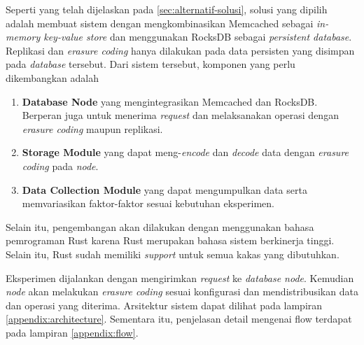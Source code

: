 
Seperti yang telah dijelaskan pada \ref{sec:alternatif-solusi}, solusi yang dipilih adalah membuat sistem dengan mengkombinasikan Memcached sebagai \textit{in-memory key-value store} dan menggunakan RocksDB sebagai \textit{persistent database}. Replikasi dan \textit{erasure coding} hanya dilakukan pada data persisten yang disimpan pada \textit{database} tersebut. Dari sistem tersebut, komponen yang perlu dikembangkan adalah
\begin{enumerate}
  \item \textbf{Database Node} yang mengintegrasikan Memcached dan RocksDB. Berperan juga untuk menerima \textit{request} dan melaksanakan operasi dengan \textit{erasure coding} maupun replikasi.
  \item \textbf{Storage Module} yang dapat meng-\textit{encode} dan \textit{decode} data dengan \textit{erasure coding} pada \textit{node}.
  \item \textbf{Data Collection Module} yang dapat mengumpulkan data serta memvariasikan faktor-faktor sesuai kebutuhan eksperimen.
\end{enumerate}

Selain itu, pengembangan akan dilakukan dengan menggunakan bahasa pemrograman Rust karena Rust merupakan bahasa sistem berkinerja tinggi. Selain itu, Rust sudah memiliki \textit{support} untuk semua kakas yang dibutuhkan.

Eksperimen dijalankan dengan mengirimkan \textit{request} ke \textit{database node}. Kemudian \textit{node} akan melakukan \textit{erasure coding} sesuai konfigurasi dan mendistribusikan data dan operasi yang diterima. Arsitektur sistem dapat dilihat pada lampiran \ref{appendix:architecture}. Sementara itu, penjelasan detail mengenai flow terdapat pada lampiran \ref{appendix:flow}.
  